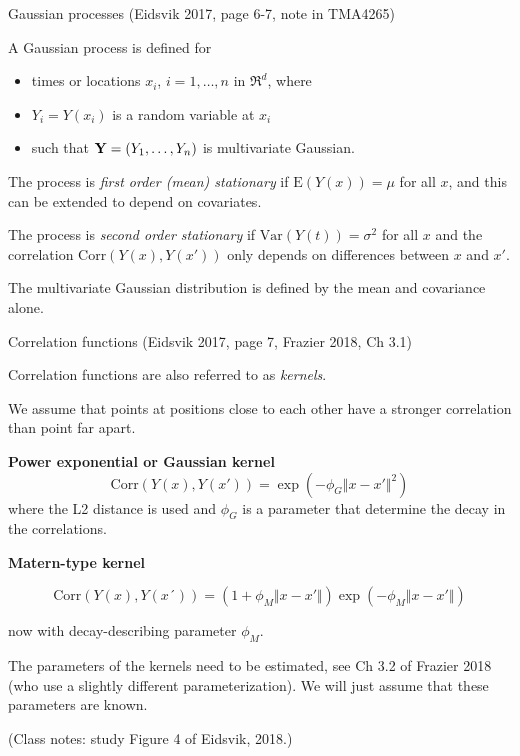 \documentclass[
  ignorenonframetext,
]{beamer}
\providecommand{\tightlist}{%
  \setlength{\itemsep}{0pt}\setlength{\parskip}{0pt}}
\begin{document}
\begin{frame}
\begin{block}{Gaussian processes}
\protect\hypertarget{gaussian-processes}{}
(Eidsvik 2017, page 6-7, note in TMA4265)

A Gaussian process is defined for

\begin{itemize}
\tightlist
\item
  times or locations \(x_i\), \(i=1,\ldots,n\) in \(\Re^d\), where
\item
  \(Y_i=Y(x_i)\) is a random variable at \(x_i\)
\item
  such that \({\bf Y}=(Y_1,\ldots,Y_n)\) is multivariate Gaussian.
\end{itemize}

The process is \emph{first order (mean) stationary} if
\(\text{E}(Y(x))=\mu\) for all \(x\), and this can be extended to depend
on covariates.

The process is \emph{second order stationary} if
\(\text{Var}(Y(t))=\sigma^2\) for all \(x\) and the correlation
\(\text{Corr}(Y(x),Y(x'))\) only depends on differences between \(x\)
and \(x'\).

The multivariate Gaussian distribution is defined by the mean and
covariance alone.
\end{block}
\end{frame}

\begin{frame}
\begin{block}{Correlation functions}
\protect\hypertarget{correlation-functions}{}
(Eidsvik 2017, page 7, Frazier 2018, Ch 3.1)

Correlation functions are also referred to as \emph{kernels}.

We assume that points at positions close to each other have a stronger
correlation than point far apart.

\textbf{Power exponential or Gaussian kernel}
\[ \text{Corr}(Y(x),Y(x'))=\exp(-\phi_G \Vert x-x' \Vert ^2)\] where the
L2 distance is used and \(\phi_G\) is a parameter that determine the
decay in the correlations.
\end{block}
\end{frame}

\begin{frame}
\textbf{Matern-type kernel}

\[\text{Corr}(Y(x),Y(x´))=(1+\phi_M \Vert x - x' \Vert)\exp(-\phi_M \Vert x - x' \Vert)\]

now with decay-describing parameter \(\phi_M\).

The parameters of the kernels need to be estimated, see Ch 3.2 of
Frazier 2018 (who use a slightly different parameterization). We will
just assume that these parameters are known.

(Class notes: study Figure 4 of Eidsvik, 2018.)
\end{frame}
\end{document}
